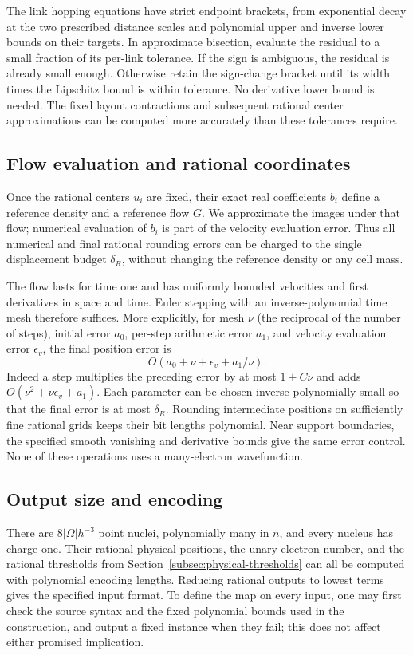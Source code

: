The link hopping equations have strict endpoint brackets, from
exponential decay at the two prescribed distance scales and polynomial
upper and inverse lower bounds on their targets. In approximate
bisection, evaluate the residual to a small fraction of its per-link
tolerance. If the sign is ambiguous, the residual is already small
enough. Otherwise retain the sign-change bracket until its width times
the Lipschitz bound is within tolerance. No derivative lower bound is
needed. The fixed layout contractions and subsequent rational center
approximations can be computed more accurately than these tolerances
require.

\subsection{Flow evaluation and rational coordinates}

Once the rational centers $u_i$ are fixed, their exact real coefficients
$b_i$ define a reference density and a reference flow $G$. We approximate
the images under that flow; numerical evaluation of $b_i$ is part of
the velocity evaluation error. Thus all numerical and final rational
rounding errors can be charged to the single displacement budget
$\delta_R$, without changing the reference density or any cell mass.

The flow lasts for time one and has uniformly bounded velocities and
first derivatives in space and time. Euler stepping with an
inverse-polynomial time mesh therefore suffices. More explicitly, for
mesh $\nu$ (the reciprocal of the number of steps), initial error $a_0$,
per-step arithmetic error $a_1$, and velocity evaluation error
$\epsilon_v$, the final position error is
\[
                  O(a_0+\nu+\epsilon_v+a_1/\nu).
\]
Indeed a step multiplies the preceding error by at most $1+C\nu$ and
adds $O(\nu^2+\nu\epsilon_v+a_1)$. Each parameter can be chosen
inverse polynomially small so that the final error is at most
$\delta_R$. Rounding intermediate positions on sufficiently fine
rational grids keeps their bit lengths polynomial. Near support
boundaries, the specified smooth vanishing and derivative bounds give
the same error control. None of these operations uses a many-electron
wavefunction.

\subsection{Output size and encoding}

There are $8|\Omega|h^{-3}$ point nuclei, polynomially many in $n$,
and every nucleus has charge one. Their rational physical positions,
the unary electron number, and the rational thresholds from
Section~\ref{subsec:physical-thresholds} can all be computed with
polynomial encoding lengths. Reducing rational outputs to lowest terms
gives the specified input format. To define the map on every input,
one may first check the source syntax and the fixed polynomial bounds
used in the construction, and output a fixed instance when they fail;
this does not affect either promised implication.

